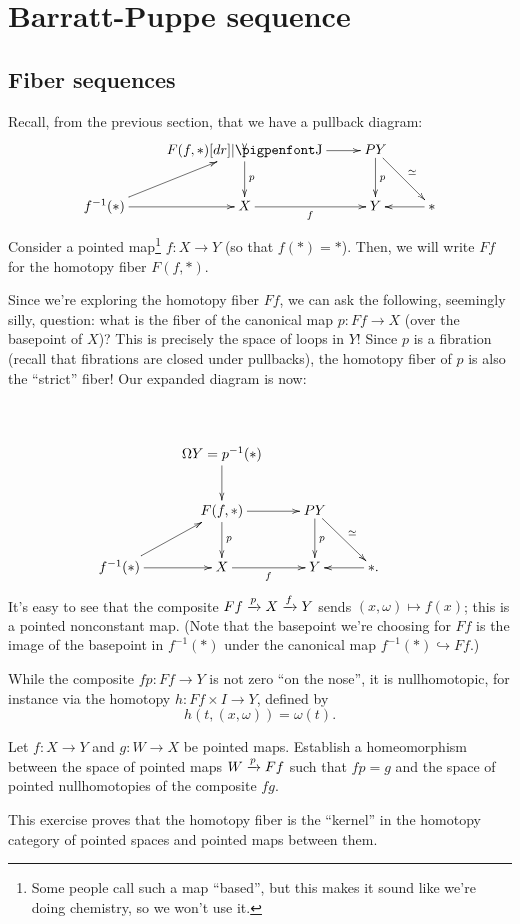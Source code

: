 \section{Barratt-Puppe sequence}\label{secbarrattpuppe}
\subsection{Fiber sequences}
Recall, from the previous section, that we have a pullback diagram:
\begin{equation*}
    \xymatrix{
	& F(f,\ast)\ar[r]\ar[d]^p \pb & PY\ar[d]^p\ar[dr]^{\simeq} & \\
	f^{-1}(\ast)\ar[ur]\ar[r] & X\ar[r]_f & Y & \ast\ar[l]
    }
\end{equation*}
Consider a pointed map\footnote{Some people call such a map ``based'', but this makes it sound like we're doing chemistry, so we won't use it.}
$f:X\to Y$ (so that $f(\ast) = \ast$). Then, we will write $Ff$ for the homotopy fiber $F(f,\ast)$.

Since we're exploring the homotopy fiber $Ff$, we can ask the following, seemingly silly, question:
what is the fiber of the canonical map $p:Ff\to X$ (over the basepoint of $X$)?
This is precisely the space of loops in $Y$!
Since $p$ is a fibration (recall that fibrations are closed under pullbacks), the homotopy fiber of $p$ is also the ``strict''
fiber!
Our expanded diagram is now:
\begin{equation*}
\xymatrix{\\
    & \Omega Y=p^{-1}(\ast)\ar[d] & & &\\
    & F(f,\ast)\ar[r]\ar[d]^p & PY\ar[d]^p\ar[dr]^{\simeq} & \\
    f^{-1}(\ast)\ar[ur]\ar[r] & X\ar[r]_f & Y & \ast.\ar[l]
}
\end{equation*}
It's easy to see that the composite $Ff\xrightarrow{{p}} X\xrightarrow{{f}} Y$ sends $(x,\omega)\mapsto f(x)$;
this is a pointed nonconstant map.
(Note that the basepoint we're choosing for $Ff$ is the image of the basepoint in $f^{-1}(\ast)$ under
the canonical map $f^{-1}(\ast)\hookrightarrow Ff$.)

While the composite $fp:Ff \to Y$ is not zero ``on the nose'', it is nullhomotopic, for instance
via the homotopy $h:Ff\times I\to Y$, defined by
$$h(t,(x,\omega)) = \omega(t).$$
\begin{exercise}\label{fiberkernel}
    Let $f:X\to Y$ and $g:W\to X$ be pointed maps.
    Establish a homeomorphism between the space of pointed maps $W \xrightarrow{{p}} Ff$ such that $fp = g$ and the space of pointed
    nullhomotopies of the composite $fg$.
\end{exercise}
This exercise proves that the homotopy fiber is the ``kernel'' in the homotopy category of pointed spaces and pointed
maps between them.

